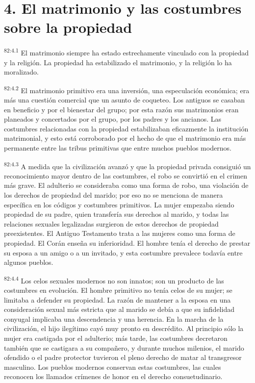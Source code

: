 \documentclass[twoside, 11pt]{book}
\begin{document}
\section*{4. El matrimonio y las costumbres sobre la propiedad}
\par
\textsuperscript{82:4.1} El matrimonio siempre ha estado estrechamente vinculado con la propiedad y la religión. La propiedad ha estabilizado el matrimonio, y la religión lo ha moralizado.

\par
\textsuperscript{82:4.2} El matrimonio primitivo era una inversión, una especulación económica; era más una cuestión comercial que un asunto de coqueteo. Los antiguos se casaban en beneficio y por el bienestar del grupo; por esta razón sus matrimonios eran planeados y concertados por el grupo, por los padres y los ancianos. Las costumbres relacionadas con la propiedad estabilizaban eficazmente la institución matrimonial, y esto está corroborado por el hecho de que el matrimonio era más permanente entre las tribus primitivas que entre muchos pueblos modernos.

\par
\textsuperscript{82:4.3} A medida que la civilización avanzó y que la propiedad privada consiguió un reconocimiento mayor dentro de las costumbres, el robo se convirtió en el crimen más grave. El adulterio se consideraba como una forma de robo, una violación de los derechos de propiedad del marido; por eso no se menciona de manera específica en los códigos y costumbres primitivos. La mujer empezaba siendo propiedad de su padre, quien transfería sus derechos al marido, y todas las relaciones sexuales legalizadas surgieron de estos derechos de propiedad preexistentes. El Antiguo Testamento trata a las mujeres como una forma de propiedad. El Corán enseña su inferioridad. El hombre tenía el derecho de prestar su esposa a un amigo o a un invitado, y esta costumbre prevalece todavía entre algunos pueblos.

\par
\textsuperscript{82:4.4} Los celos sexuales modernos no son innatos; son un producto de las costumbres en evolución. El hombre primitivo no tenía celos de su mujer; se limitaba a defender su propiedad. La razón de mantener a la esposa en una consideración sexual más estricta que al marido se debía a que su infidelidad conyugal implicaba una descendencia y una herencia. En la marcha de la civilización, el hijo ilegítimo cayó muy pronto en descrédito. Al principio sólo la mujer era castigada por el adulterio; más tarde, las costumbres decretaron también que se castigara a su compañero, y durante muchos milenios, el marido ofendido o el padre protector tuvieron el pleno derecho de matar al transgresor masculino. Los pueblos modernos conservan estas costumbres, las cuales reconocen los llamados crímenes de honor en el derecho consuetudinario.
\end{document}

